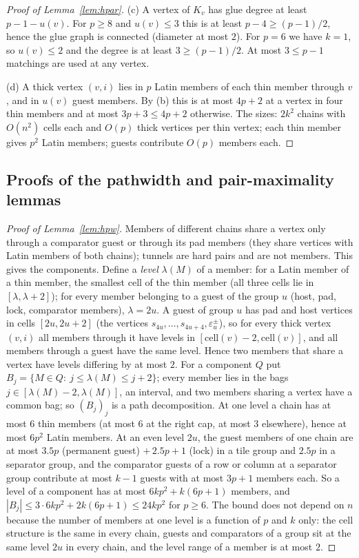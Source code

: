 \begin{proof}[Proof of Lemma~\ref{lem:hpar}]
(c) A vertex of $K_v$ has glue degree at least $p-1-u(v)$. For $p\ge8$ and $u(v)\le3$ this is at least $p-4\ge(p-1)/2$, hence the glue graph is connected (diameter at most $2$). For $p=6$ we have $k=1$, so $u(v)\le2$ and the degree is at least $3\ge(p-1)/2$. At most $3\le p-1$ matchings are used at any vertex.

(d) A thick vertex $(v,i)$ lies in $p$ Latin members of each thin member through $v$, and in $u(v)$ guest members. By (b) this is at most $4p+2$ at a vertex in four thin members and at most $3p+3\le4p+2$ otherwise. The sizes: $2k^2$ chains with $O(n^2)$ cells each and $O(p)$ thick vertices per thin vertex; each thin member gives $p^2$ Latin members; guests contribute $O(p)$ members each.
\end{proof}
\subsection{Proofs of the pathwidth and pair-maximality lemmas}
\begin{proof}[Proof of Lemma~\ref{lem:hpw}]
Members of different chains share a vertex only through a comparator guest or through its pad members (they share vertices with Latin members of both chains); tunnels are hard pairs and are not members. This gives the components. Define a \emph{level} $\lambda(M)$ of a member: for a Latin member of a thin member, the smallest cell of the thin member (all three cells lie in $[\lambda,\lambda+2]$); for every member belonging to a guest of the group $u$ (host, pad, lock, comparator members), $\lambda=2u$. A guest of group $u$ has pad and host vertices in cells $[2u,2u+2]$ (the vertices $s_{4u},\dots,s_{4u+4},\varepsilon^\pm_u$), so for every thick vertex $(v,i)$ all members through it have levels in $[\mathrm{cell}(v)-2,\mathrm{cell}(v)]$, and all members through a guest have the same level. Hence two members that share a vertex have levels differing by at most $2$. For a component $Q$ put $B_j=\{M\in Q:\ j\le\lambda(M)\le j+2\}$; every member lies in the bags $j\in[\lambda(M)-2,\lambda(M)]$, an interval, and two members sharing a vertex have a common bag; so $(B_j)_j$ is a path decomposition. At one level a chain has at most $6$ thin members (at most $6$ at the right cap, at most $3$ elsewhere), hence at most $6p^2$ Latin members. At an even level $2u$, the guest members of one chain are at most $3.5p$ (permanent guest) $+\,2.5p+1$ (lock) in a tile group and $2.5p$ in a separator group, and the comparator guests of a row or column at a separator group contribute at most $k-1$ guests with at most $3p+1$ members each. So a level of a component has at most $6kp^2+k(6p+1)$ members, and $|B_j|\le3\cdot6kp^2+2k(6p+1)\le24kp^2$ for $p\ge6$. The bound does not depend on $n$ because the number of members at one level is a function of $p$ and $k$ only: the cell structure is the same in every chain, guests and comparators of a group sit at the same level $2u$ in every chain, and the level range of a member is at most $2$.
\end{proof}
